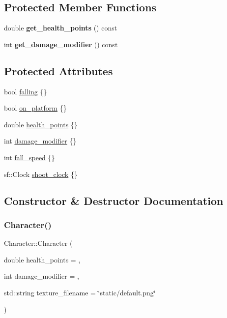 \subsection*{Protected Member Functions}
\begin{DoxyCompactItemize}
\item 
\mbox{\label{classCharacter_a1268d0c5fb2c3104cb4d22fef09d9529}} 
double {\bfseries get\+\_\+health\+\_\+points} () const
\item 
\mbox{\label{classCharacter_ae64146ff1a06035904b44364e9851767}} 
int {\bfseries get\+\_\+damage\+\_\+modifier} () const
\end{DoxyCompactItemize}
\subsection*{Protected Attributes}
\begin{DoxyCompactItemize}
\item 
bool \hyperlink{classCharacter_aeaed78cd2c9aeacaa3c86ab3e329819b}{falling} \{\}
\item 
bool \hyperlink{classCharacter_a5706469de2945e3ce0a39ff1df4c50d9}{on\+\_\+platform} \{\}
\item 
double \hyperlink{classCharacter_a8b8070c769a40358a893340513b0b651}{health\+\_\+points} \{\}
\item 
int \hyperlink{classCharacter_adfb4e2ac159c383b260a458b70852c06}{damage\+\_\+modifier} \{\}
\item 
int \hyperlink{classCharacter_a7a0c774f3743df3c4025820f7da91541}{fall\+\_\+speed} \{\}
\item 
sf\+::\+Clock \hyperlink{classCharacter_a93214fb7df7c0b20366a50dacdd03a49}{shoot\+\_\+clock} \{\}
\end{DoxyCompactItemize}


\subsection{Constructor \& Destructor Documentation}
\mbox{\label{classCharacter_af937c759ea30a7e387c31c23374dd5a6}} 
\subsubsection{\texorpdfstring{Character()}{Character()}}
{\footnotesize\ttfamily Character\+::\+Character (\begin{DoxyParamCaption}\item[{double}]{health\+\_\+points = {},  }\item[{int}]{damage\+\_\+modifier = {},  }\item[{std\+::string}]{texture\+\_\+filename = {\ttfamily \char`\"{}static/default.png\char`\"{}} }\end{DoxyParamCaption})}

